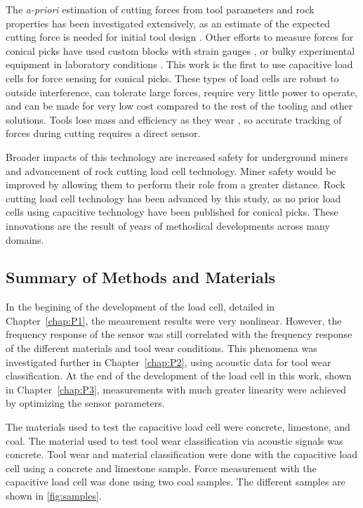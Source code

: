 The \textit{a-priori} estimation of cutting forces from tool parameters and rock properties has been 
investigated extensively, as an estimate of the expected cutting force is needed for initial tool design \cite{Li2018ATM, Morshedlou2023}.
Other efforts to measure forces for conical picks have used custom blocks with strain gauges \cite{s23239521}, 
or bulky experimental equipment in laboratory conditions \cite{WANG2018210}.
This work is the first to use capacitive load cells for force sensing for conical picks. 
These types of load cells are robust to outside interference, can tolerate large forces,
require very little power to operate, and can be made for very low cost compared to the rest of the tooling and other solutions.
Tools lose mass and efficiency as they wear \cite{Pawlik2022-cj}, so accurate tracking of forces during cutting requires a direct sensor.

Broader impacts of this technology are increased safety for underground miners 
and advancement of rock cutting load cell technology.
Miner safety would be improved by allowing them to perform their role from a greater distance.
Rock cutting load cell technology has been advanced by this study, 
as no prior load cells using capacitive technology have been published for conical picks.
These innovations are the result of years of methodical developments across many domains.

\subsection{Summary of Methods and Materials}

In the begining of the development of the load cell, detailed in Chapter~\ref{chap:P1},
the meaurement results were very nonlinear. However, the frequency response of the sensor
was still correlated with the frequency response of the different materials and tool wear conditions.
This phenomena was investigated further in Chapter~\ref{chap:P2}, using acoustic data for tool wear classification.
At the end of the development of the load cell in this work, shown in Chapter~\ref{chap:P3},
measurements with much greater linearity were achieved by optimizing the sensor parameters.

The materials used to test the capacitive load cell were concrete, limestone, and coal.
The material used to test tool wear classification via acoustic signals was concrete.
Tool wear and material classification were done with the capacitive load cell using a concrete and limestone sample.
Force measurement with the capacitive load cell was done using two coal samples.
The different samples are shown in \ref{fig:samples}.

